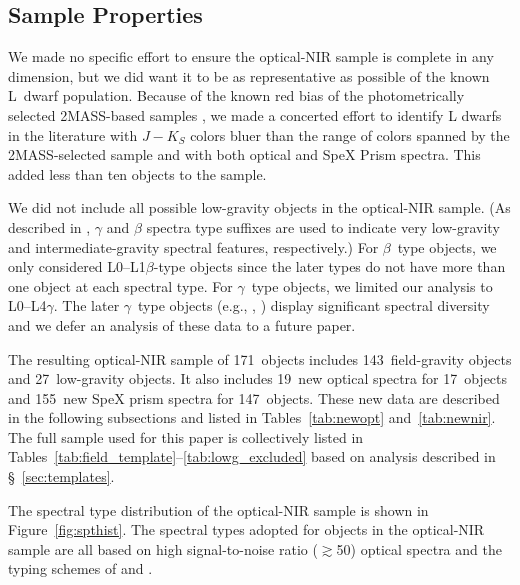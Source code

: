 \documentclass[modern]{aastex61}
\newcommand{\sample}{171}
\newcommand{\optField}{143}
\newcommand{\optLowG}{27}
\newcommand{\NewOptSpectra}{19} %
\newcommand{\NewOptObjects}{17} %
\newcommand{\NewPrismSpectra}{155} %
\newcommand{\NewPrismObjects}{147} %
\begin{document}


\subsection{Sample Properties}

We made no specific effort to ensure the optical-NIR sample is complete in any dimension, but we did want it to be as representative as possible of the known L~dwarf population.
Because of the known red bias of the photometrically selected 2MASS-based samples \cite[Figure 3]{Schmidt10}, we made a concerted effort to identify L dwarfs in the literature with $J-K_S$ colors bluer than the range of colors spanned by the 2MASS-selected sample and with both optical and SpeX Prism spectra.
This added less than ten objects to the sample.

We did not include all possible low-gravity objects in the optical-NIR sample.
(As described in \citealt{Cruz09_lowg}, $\gamma$ and $\beta$ spectra type suffixes are used to indicate very low-gravity and intermediate-gravity spectral features, respectively.)
For $\beta$~type objects, we only considered L0--L1$\beta$-type objects since the later types do not have more than one object at each spectral type.
For $\gamma$~type objects, we limited our analysis to L0--L4$\gamma$.
The later $\gamma$~type objects (e.g., , \citealt{Cruz09_lowg}) display significant spectral diversity and we defer an analysis of these data to a future paper.

The resulting optical-NIR sample of \sample~objects includes \optField~field-gravity objects and \optLowG~low-gravity objects.
It also includes \NewOptSpectra~new optical spectra for \NewOptObjects~objects and \NewPrismSpectra~new SpeX prism spectra for \NewPrismObjects~objects.
These new data are described in the following subsections and listed in Tables~\ref{tab:newopt} and~\ref{tab:newnir}. The full sample used for this paper is collectively listed in Tables~\ref{tab:field_template}--\ref{tab:lowg_excluded} based on analysis described in \S~\ref{sec:templates}.

The spectral type distribution of the optical-NIR sample is shown in Figure~\ref{fig:spthist}.
The spectral types adopted for objects in the optical-NIR sample are all based on high signal-to-noise ratio ($\gtrsim$50) optical spectra and the typing schemes of \cite{K99} and \cite{Cruz09_lowg}.
\end{document}
